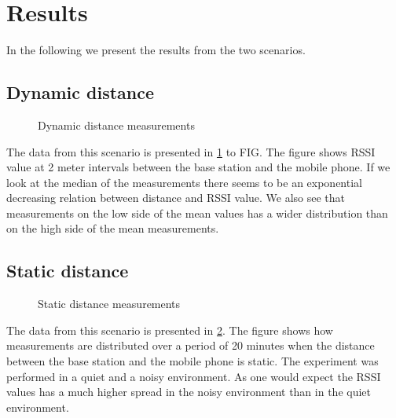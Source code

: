 \section{Results}
\label{sec_results}

In the following we present the results from the two scenarios.

\subsection{Dynamic distance}

\begin{figure}		
	
	
	
	\caption{ Dynamic distance measurements }
	\label{graf_DynamicMesurements}
	
\end{figure}

%	
%	
%	
%	

The data from this scenario is presented in \cref{graf_DynamicMesurements} to FIG.
The figure shows RSSI value at 2 meter intervals between the base station and the mobile phone.
If we look at the median of the measurements there seems to be an exponential decreasing relation between distance and RSSI value.
We also see that measurements on the low side of the mean values has a wider distribution than on the high side of the mean measurements.

\subsection{Static distance}
\begin{figure}
	
	
	\caption{Static distance measurements}
	\label{graf_StaticMesurements}
\end{figure}

The data from this scenario is presented in \cref{graf_StaticMesurements}.
The figure shows how measurements are distributed over a period of 20 minutes when the distance between the base station and the mobile phone is static.
The experiment was performed in a quiet and a noisy environment.
As one would expect the RSSI values has a much higher spread in the noisy environment than in the quiet environment. 
 

